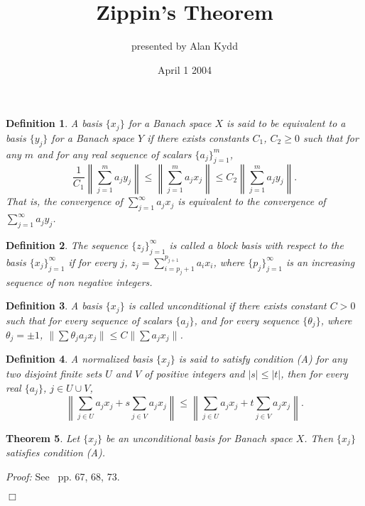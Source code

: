 \documentclass[12pt]{report}
\title{Zippin's Theorem}
\author{presented by Alan Kydd}
\date{April 1 2004}
\newcommand\done{\begin{flushright}$\Box$\end{flushright}}
\newtheorem{defn}{Definition}
\newtheorem{theorem}[defn]{Theorem}
\begin{document}
\maketitle

\begin{defn}
A basis $\{x_j\}$ for a Banach space $X$ is said to be equivalent to a basis
$\{y_j\}$ for a Banach space $Y$ if there exists constants $C_1$,
$C_2 \geq 0$ such that for any $m$ and for any real sequence of scalars $\{a_j\}_{j=1}^m$,
$$
\frac{1}{C_1}\left\|\sum_{j=1}^m a_j y_j \right\| \leq \left\|\sum_{j=1}^m a_j x_j \right\|
\leq C_2 \left\|\sum_{j=1}^m a_j y_j \right\|.
$$
That is, the convergence of $\sum_{j=1}^\infty a_j x_j$ is equivalent to the convergence of
$\sum_{j=1}^\infty a_j y_j$.
\end{defn}

\begin{defn}
The sequence $\{z_j\}_{j=1}^\infty$ is called a block basis with respect to the basis
$\{x_j\}_{j=1}^\infty$ if for every $j$, $z_j = \sum_{i=p_{j}+1}^{p_{j+1}} a_i x_i$, where
$\{p_j\}_{j=1}^\infty$ is an increasing sequence of non negative integers.
\end{defn}

\begin{defn}
A basis $\{x_j\}$ is called unconditional if there exists constant $C>0$ such that for every
sequence of scalars $\{a_j\}$, and for every sequence $\{\theta_j\}$,
where $\theta_j = \pm 1$, $\|\sum \theta_j a_j x_j\| \leq C\|\sum a_j x_j\|$.
\end{defn}


\begin{defn}
A normalized basis $\{x_j\}$ is said to satisfy condition (A) for any two disjoint finite
sets $U$ and $V$ of positive integers and $|s| \leq |t|$, then for every real $\{a_j\}$, $j\in U\cup V$,
$$
\left\| \sum_{j\in U} a_j x_j + s\sum_{j\in V} a_j x_j\right\| \leq
\left\| \sum_{j\in U} a_j x_j + t\sum_{j\in V} a_j x_j\right\|.
$$
\end{defn}

\begin{theorem}\label{daybook}
Let $\{x_j\}$ be an unconditional basis for Banach space $X$.  Then $\{x_j\}$ satisfies condition (A).
\end{theorem}
{\it Proof:}
See~\cite{Day} pp. 67, 68, 73.\done
\end{document}
